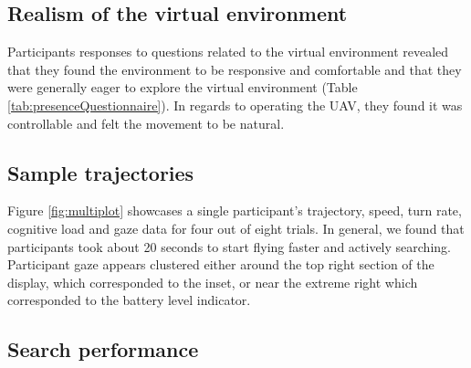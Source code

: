\documentclass{article}
\begin{document}
	
	\subsection{Realism of the virtual environment}
	
	
	Participants responses to questions related to the virtual environment revealed that they found the environment to be responsive and comfortable and that they were generally eager to explore the virtual environment  (Table \ref{tab:presenceQuestionnaire}). In regards to operating the UAV, they found it was controllable and felt the movement to be natural.
	
	\subsection{Sample trajectories}
	
	Figure \ref{fig:multiplot} showcases a single participant's trajectory, speed, turn rate, cognitive load and gaze data for four out of eight trials. In general, we found that participants took about 20 seconds to start flying faster and actively searching. Participant gaze appears clustered either around the top right section of the display, which corresponded to the inset, or near the extreme right which corresponded to the battery level indicator. %
	
	
	
	\subsection{Search performance}
	
\end{document}
